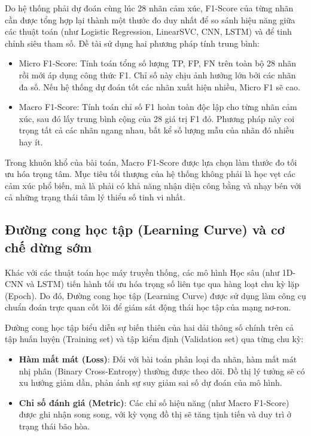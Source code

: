 Do hệ thống phải dự đoán cùng lúc 28 nhãn cảm xúc, F1-Score của từng nhãn cần được tổng hợp lại thành một thước đo duy nhất để so sánh hiệu năng giữa các thuật toán (như Logistic Regression, LinearSVC, CNN, LSTM) và để tinh chỉnh siêu tham số. Đề tài sử dụng hai phương pháp tính trung bình:
\begin{itemize}
	\item Micro F1-Score: Tính toán tổng số lượng TP, FP, FN trên toàn bộ 28 nhãn rồi mới áp dụng công thức F1. Chỉ số này chịu ảnh hưởng lớn bởi các nhãn đa số. Nếu hệ thống dự đoán tốt các nhãn xuất hiện nhiều, Micro F1 sẽ cao.
	
	\item Macro F1-Score: Tính toán chỉ số F1 hoàn toàn độc lập cho từng nhãn cảm xúc, sau đó lấy trung bình cộng của 28 giá trị F1 đó. Phương pháp này coi trọng tất cả các nhãn ngang nhau, bất kể số lượng mẫu của nhãn đó nhiều hay ít.
\end{itemize}

Trong khuôn khổ của bài toán, Macro F1-Score được lựa chọn làm thước đo tối ưu hóa trọng tâm. Mục tiêu tối thượng của hệ thống không phải là học vẹt các cảm xúc phổ biến, mà là phải có khả năng nhận diện công bằng và nhạy bén với cả những trạng thái tâm lý thiểu số tinh vi nhất.

\subsection{Đường cong học tập (Learning Curve) và cơ chế dừng sớm}

Khác với các thuật toán học máy truyền thống, các mô hình Học sâu (như 1D-CNN và LSTM) tiến hành tối ưu hóa trọng số liên tục qua hàng loạt chu kỳ lặp (Epoch). Do đó, Đường cong học tập (Learning Curve) được sử dụng làm công cụ chuẩn đoán trực quan cốt lõi để giám sát động thái học tập của mạng nơ-ron.

Đường cong học tập biểu diễn sự biến thiên của hai dải thông số chính trên cả tập huấn luyện (Training set) và tập kiểm định (Validation set) qua từng chu kỳ:
\begin{itemize}
	\item \textbf{Hàm mất mát (Loss)}: Đối với bài toán phân loại đa nhãn, hàm mất mát nhị phân (Binary Cross-Entropy) thường được theo dõi. Đồ thị lý tưởng sẽ có xu hướng giảm dần, phản ánh sự suy giảm sai số dự đoán của mô hình.
	
	\item \textbf{Chỉ số đánh giá (Metric)}: Các chỉ số hiệu năng (như Macro F1-Score) được ghi nhận song song, với kỳ vọng đồ thị sẽ tăng tịnh tiến và duy trì ở trạng thái bão hòa.
\end{itemize}

